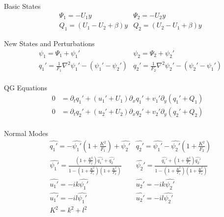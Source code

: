 \documentclass[12pt]{article}
\begin{document}
    \begin{subsection}{Basic States}
        \begin{align*}
            &\Psi_1 = -U_1 y                      &\Psi_2 = -U_2 y \\
            &Q_1 = (U_1 - U_2 + \beta) y   &Q_2 = (U_2 - U_1 + \beta) y
        \end{align*}
    \end{subsection}

    \begin{subsection}{New States and Perturbations}
        \begin{align*}
             &\psi_1 = \Psi_1 + \psi_1'
             &\psi_2 = \Psi_2 + \psi_2' \\
             &q_1' = \frac{1}{F_1}\nabla^2\psi_1' - (\psi_1' - \psi_2')
             &q_2' = \frac{1}{F_2}\nabla^2\psi_2' - (\psi_2' - \psi_1') \\
        \end{align*}
    \end{subsection}

    \begin{subsection}{QG Equations}
        \begin{align*}
             0 &= \partial_t q_1' + (u_1' + U_1)\partial_x q_1' + v_1' \partial_y(q_1' + Q_1) \\
             0 &= \partial_t q_2' + (u_2' + U_2)\partial_x q_2' + v_2' \partial_y(q_2' + Q_2) \\
        \end{align*}
    \end{subsection}

    \begin{subsection}{Normal Modes}
        \begin{align*}
             &\hat{q_1'} = -\hat{\psi_1'}\left( 1 + \frac{K^2}{F_1} \right) + \hat{\psi_2'}
             &\hat{q_2'} = \hat{\psi_1'} - \hat{\psi_2'}\left( 1 + \frac{K^2}{F_2} \right) \\
            &\hat{\psi_1'} = \frac{\left( 1 + \frac{K^2}{F_2} \right) \hat{q_1'} + \hat{q_2'}}{1 - \left( 1 + \frac{K^2}{F_1} \right)\left( 1 + \frac{K^2}{F_2} \right)}
            &\hat{\psi_2'} = \frac{\hat{q_1'} + \left( 1 + \frac{K^2}{F_1} \right)\hat{q_2'}}{1 - \left( 1 + \frac{K^2}{F_1} \right)\left( 1 + \frac{K^2}{F_2} \right)} \\
            &\hat{u_1'} = -ik \hat{\psi_1'}
            &\hat{u_2'} = -ik \hat{\psi_2'} \\
            &\hat{u_1'} = -il \hat{\psi_1'}
            &\hat{u_2'} = -il \hat{\psi_2'} \\
            &K^2 = k^2 + l^2
        \end{align*}
    \end{subsection}
\end{document}
